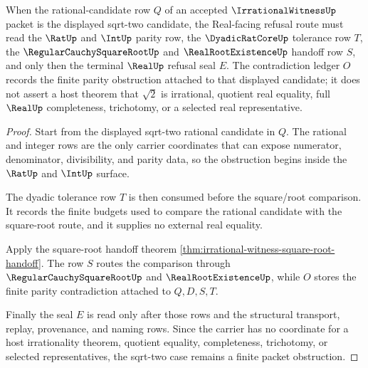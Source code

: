 \begin{theorem}
\label{thm:irrational-witness-sqrt-two-specialization}
When the rational-candidate row $Q$ of an accepted $\IrrationalWitnessUp$ packet is the displayed sqrt-two candidate, the Real-facing refusal route must read the $\RatUp$ and $\IntUp$ parity row, the $\DyadicRatCoreUp$ tolerance row $T$, the $\RegularCauchySquareRootUp$ and $\RealRootExistenceUp$ handoff row $S$, and only then the terminal $\RealUp$ refusal seal $E$. The contradiction ledger $O$ records the finite parity obstruction attached to that displayed candidate; it does not assert a host theorem that $\sqrt{2}$ is irrational, quotient real equality, full $\RealUp$ completeness, trichotomy, or a selected real representative.
\end{theorem}
\begin{proof}
Start from the displayed sqrt-two rational candidate in $Q$. The rational and integer rows are the only carrier coordinates that can expose numerator, denominator, divisibility, and parity data, so the obstruction begins inside the $\RatUp$ and $\IntUp$ surface.

The dyadic tolerance row $T$ is then consumed before the square/root comparison. It records the finite budgets used to compare the rational candidate with the square-root route, and it supplies no external real equality.

Apply the square-root handoff theorem \autoref{thm:irrational-witness-square-root-handoff}. The row $S$ routes the comparison through $\RegularCauchySquareRootUp$ and $\RealRootExistenceUp$, while $O$ stores the finite parity contradiction attached to $Q,D,S,T$.

Finally the seal $E$ is read only after those rows and the structural transport, replay, provenance, and naming rows. Since the carrier has no coordinate for a host irrationality theorem, quotient equality, completeness, trichotomy, or selected representatives, the sqrt-two case remains a finite packet obstruction.
\end{proof}


